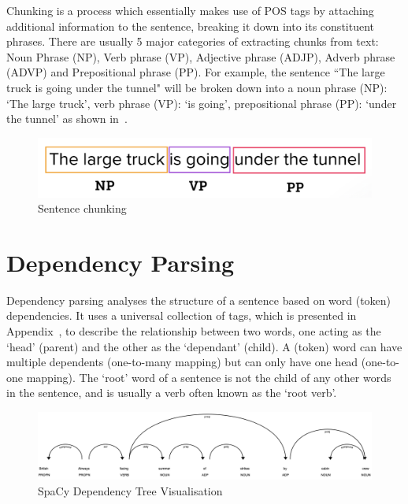 Chunking is a process which essentially makes use of POS tags by attaching additional information to the sentence, breaking it down into its constituent phrases. There are usually 5 major categories of extracting chunks from text: Noun Phrase (NP), Verb phrase (VP), Adjective phrase (ADJP), Adverb phrase (ADVP) and Prepositional phrase (PP). 
For example, the sentence ``The large truck is going under the tunnel" will be broken down into a noun phrase (NP): `The large truck', verb phrase (VP): `is going', prepositional phrase (PP): `under the tunnel' as shown in~.

\begin{figure}[H]
\centering
\includegraphics[scale=0.35]{images/chunking.png}
\caption{Sentence chunking}
\label{fig:chunking}
\end{figure}



\section{Dependency Parsing} \label{dependency_grammar}

Dependency parsing analyses the structure of a sentence based on word (token) dependencies. It uses a universal collection of tags, which is presented in Appendix~, to describe the relationship between two words, one acting as the `head' (parent) and the other as the `dependant' (child). A (token) word can have multiple dependents (one-to-many mapping) but can only have one head (one-to-one mapping). The `root' word of a sentence is not the child of any other words in the sentence, and is usually a verb often known as the `root verb'.

\begin{figure}[H]
    \centering
    \includegraphics[width=\textwidth]{images/displayCy.png}
    \caption{SpaCy Dependency Tree Visualisation~\cite{spacy_ling}}
    \label{fig:displacy}
\end{figure}

